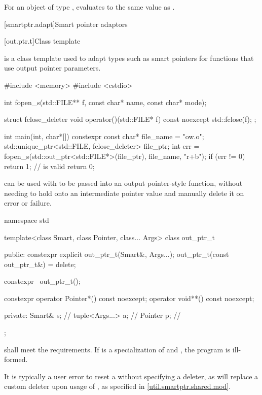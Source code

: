 \begin{itemdescr}
\pnum
For an object  of type ,
 evaluates to
the same value as .
\end{itemdescr}%

[smartptr.adapt]{Smart pointer adaptors}

[out.ptr.t]{Class template }

\pnum
{} is a class template used to adapt types
such as smart pointers
for functions that use output pointer parameters.

\pnum
\begin{example}
\begin{codeblock}
#include <memory>
#include <cstdio>

int fopen_s(std::FILE** f, const char* name, const char* mode);

struct fclose_deleter {
  void operator()(std::FILE* f) const noexcept {
    std::fclose(f);
  }
};

int main(int, char*[]) {
  constexpr const char* file_name = "ow.o";
  std::unique_ptr<std::FILE, fclose_deleter> file_ptr;
  int err = fopen_s(std::out_ptr<std::FILE*>(file_ptr), file_name, "r+b");
  if (err != 0)
    return 1;
  //  is valid
  return 0;
}
\end{codeblock}
 can be used with 
to be passed into an output pointer-style function,
without needing to hold onto an intermediate pointer value and
manually delete it on error or failure.
\end{example}

%
\begin{codeblock}
namespace std {
  template<class Smart, class Pointer, class... Args>
  class out_ptr_t {
  public:
    constexpr explicit out_ptr_t(Smart&, Args...);
    out_ptr_t(const out_ptr_t&) = delete;

    constexpr ~out_ptr_t();

    constexpr operator Pointer*() const noexcept;
    operator void**() const noexcept;

  private:
    Smart& s;                   // \expos
    tuple<Args...> a;           // \expos
    Pointer p;                  // \expos
  };
}
\end{codeblock}

\pnum
{} shall meet the  requirements.
If  is a specialization of  and
,
the program is ill-formed.
\begin{note}
It is typically a user error to reset a 
without specifying a deleter,
as  will replace a custom deleter upon usage of ,
as specified in \ref{util.smartptr.shared.mod}.
\end{note}

